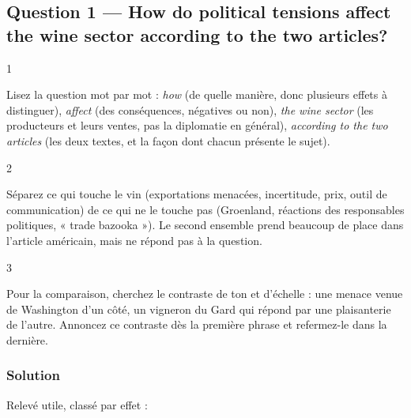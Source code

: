 \documentclass[11pt,a4paper]{article}
\begin{document}
\hypertarget{question-1-how-do-political-tensions-affect-the-wine-sector-according-to-the-two-articles}{%
\subsection{Question 1 --- How do political tensions affect the wine sector according to the two articles?}\label{question-1-how-do-political-tensions-affect-the-wine-sector-according-to-the-two-articles}}

\begin{indication}{1}

Lisez la question mot par mot : \emph{how} (de quelle manière, donc plusieurs effets à distinguer), \emph{affect} (des conséquences, négatives ou non), \emph{the wine sector} (les producteurs et leurs ventes, pas la diplomatie en général), \emph{according to the two articles} (les deux textes, et la façon dont chacun présente le sujet).

\end{indication}

\begin{indication}{2}

Séparez ce qui touche le vin (exportations menacées, incertitude, prix, outil de communication) de ce qui ne le touche pas (Groenland, réactions des responsables politiques, « trade bazooka »). Le second ensemble prend beaucoup de place dans l'article américain, mais ne répond pas à la question.

\end{indication}

\begin{indication}{3}

Pour la comparaison, cherchez le contraste de ton et d'échelle : une menace venue de Washington d'un côté, un vigneron du Gard qui répond par une plaisanterie de l'autre. Annoncez ce contraste dès la première phrase et refermez-le dans la dernière.

\end{indication}

\hypertarget{solution}{%
\subsubsection{Solution}\label{solution}}

Relevé utile, classé par effet :
\end{document}
